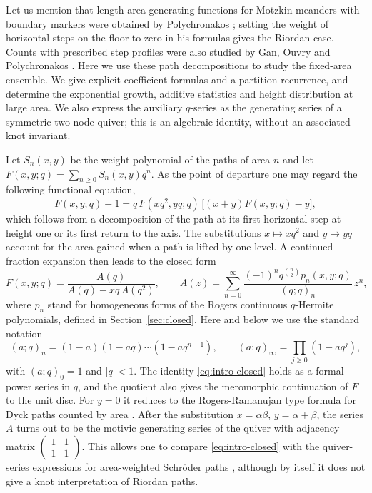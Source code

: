 \documentclass[11pt,reqno]{amsart}
\numberwithin{equation}{section}
\theoremstyle{remark}
\begin{document}
Let us mention that length-area generating functions for Motzkin meanders with boundary
markers were obtained by Polychronakos \cite{Poly22}; setting the weight of horizontal
steps on the floor to zero in his formulas gives the Riordan case. Counts with prescribed
step profiles were also studied by Gan, Ouvry and Polychronakos \cite{GOP22}. Here we use
these path decompositions to study the fixed-area ensemble. We give explicit coefficient
formulas and a partition recurrence, and determine the exponential growth, additive
statistics and height distribution at large area. We also express the auxiliary
$q$-series as the generating series of a symmetric two-node quiver; this is an algebraic
identity, without an associated knot invariant.

Let $S_n(x,y)$ be the weight polynomial of the paths of area $n$ and let
$F(x,y;q)=\sum_{n\ge0}S_n(x,y)q^n$. As the point of departure one may regard the
following functional equation,
\begin{equation}\label{eq:intro-fe}
F(x,y;q)-1=q\,F(xq^2,yq;q)\,\big[(x+y)F(x,y;q)-y\big],
\end{equation}
which follows from a decomposition of the path at its first horizontal step at height one
or its first return to the axis. The substitutions $x\mapsto xq^2$ and $y\mapsto yq$
account for the area gained when a path is lifted by one level. A continued fraction
expansion then leads to the closed form
\begin{equation}\label{eq:intro-closed}
F(x,y;q)=\frac{A(q)}{A(q)-xq\,A(q^2)},\qquad
A(z)=\sum_{n=0}^{\infty}\frac{(-1)^nq^{\binom n2}p_n(x,y;q)}{(q;q)_n}\,z^n,
\end{equation}
where $p_n$ stand for homogeneous forms of the Rogers continuous $q$-Hermite polynomials,
defined in Section~\ref{sec:closed}. Here and below we use the standard notation
\[
(a;q)_n=(1-a)(1-aq)\cdots(1-aq^{n-1}),\qquad (a;q)_\infty=\prod_{j\ge0}(1-aq^j),
\]
with $(a;q)_0=1$ and $|q|<1$. The identity \eqref{eq:intro-closed} holds as a formal
power series in $q$, and the quotient also gives the meromorphic continuation of $F$ to
the unit disc. For $y=0$ it reduces to the Rogers-Ramanujan type formula for Dyck paths
counted by area \cite{Flajolet80,FS09}. After the substitution $x=\alpha\beta$,
$y=\alpha+\beta$, the series $A$ turns out to be the motivic generating series of the
quiver with adjacency matrix $\left(\begin{smallmatrix}1&1\\1&1\end{smallmatrix}\right)$.
This allows one to compare \eqref{eq:intro-closed} with the quiver-series expressions for
area-weighted Schr\"oder paths \cite{PSS18,SS25}, although by itself it does not give a
knot interpretation of Riordan paths.
\end{document}
